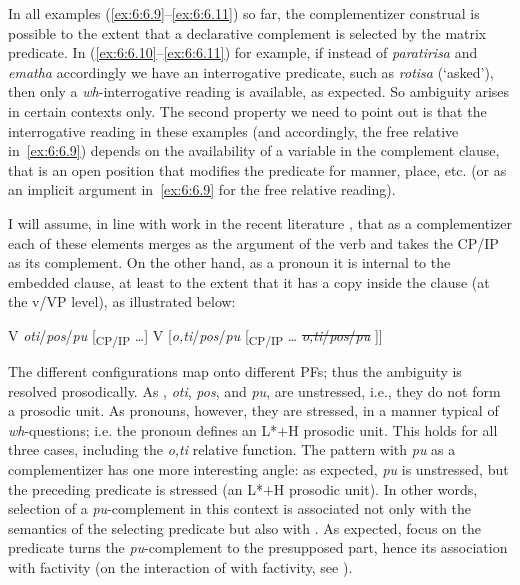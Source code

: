 \documentclass[output=paper]{langsci/langscibook}
\begin{document}
In all examples (\ref{ex:6:6.9}–\ref{ex:6:6.11}) so far, the complementizer construal is possible to the
extent that a declarative complement is selected by the matrix predicate. In
(\ref{ex:6:6.10}–\ref{ex:6:6.11}) for example, if instead of \emph{paratirisa} and \emph{ematha}
accordingly we have an interrogative predicate, such as \emph{rotisa}
(‘asked’), then only a \emph{wh}-interrogative reading is available, as expected. So
ambiguity arises in certain contexts only. The second property we need to point
out is that the interrogative reading in these examples (and accordingly, the
free relative in~\eqref{ex:6:6.9}) depends on the availability of a variable in the
complement clause, that is an open position that modifies the predicate for
manner, place, etc. (or as an implicit argument in~\eqref{ex:6:6.9} for the free relative
reading).

I will assume, in line with work in the recent literature
\parencite{ManSav2007,ManSav2011,Roussou2010,Franco2012}, that as a
complementizer each of these elements merges as the argument of the verb and
takes the CP/IP as its complement. On the other hand, as a pronoun it is
internal to the embedded clause, at least to the extent that it has a copy
inside the clause (at the v/VP level), as illustrated below:\largerpage

\ea\label{ex:6:6.12}
    \ea V \emph{oti}/\emph{pos}/\emph{pu} [\textsubscript{CP/}\textsubscript{IP} \dots{}]
    \ex V [\emph{o,ti}/\emph{pos}/\emph{pu} [\textsubscript{CP/}\textsubscript{IP} \dots{} \sout{\emph{o,ti}/\emph{pos}/\emph{pu}} ]]
	\z
\z

The different configurations map onto different \glspl{PF}; thus the ambiguity is
resolved prosodically. As , \emph{oti}, \emph{pos}, and
\emph{pu}, are unstressed, i.e., they do not form a prosodic unit. As pronouns,
however, they are stressed, in a manner typical of \emph{wh}-questions; i.e. the
pronoun defines an L*$+$H prosodic unit. This holds for all three cases,
including the \emph{o,ti} relative function. The pattern with \emph{pu} as a
complementizer has one more interesting angle: as expected, \emph{pu} is
unstressed, but the preceding predicate is stressed (an L*$+$H prosodic unit). In
other words, selection of a \emph{pu}{}-complement in this context is
associated not only with the semantics of the selecting predicate but also with
. As expected, focus on the predicate turns the \emph{pu}{}-complement to
the presupposed part, hence its association with factivity (on the interaction
of  with factivity, see \citealt{Kallulli2006}).
\end{document}
